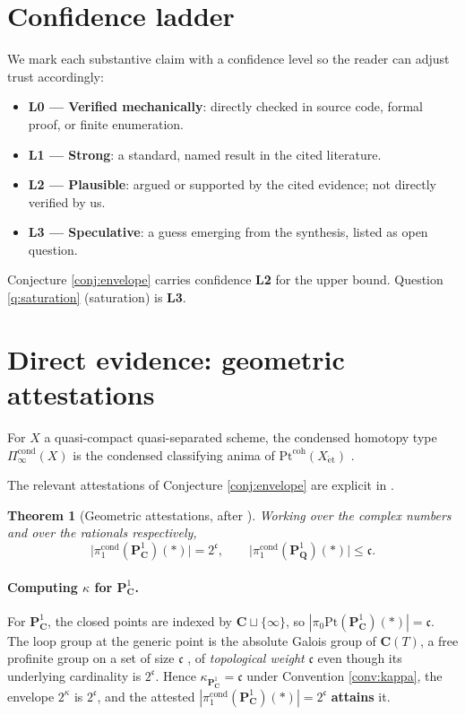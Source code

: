 \documentclass[11pt]{article}
\theoremstyle{definition}
\theoremstyle{plain}
\newtheorem{theorem}{Theorem}
\theoremstyle{remark}
\newcommand{\Pt}{\mathrm{Pt}}
\newcommand{\Pone}{\mathbf{P}^{1}}
\newcommand{\C}{\mathbf{C}}
\newcommand{\Q}{\mathbf{Q}}
\newcommand{\continuum}{\mathfrak{c}}
\begin{document}
\section{Confidence ladder}\label{sec:confidence}

We mark each substantive claim with a confidence level so the reader can
adjust trust accordingly:

\begin{itemize}
\item \textbf{L0 --- Verified mechanically}: directly checked in source code,
  formal proof, or finite enumeration.
\item \textbf{L1 --- Strong}: a standard, named result in the cited literature.
\item \textbf{L2 --- Plausible}: argued or supported by the cited evidence; not
  directly verified by us.
\item \textbf{L3 --- Speculative}: a guess emerging from the synthesis, listed
  as open question.
\end{itemize}

Conjecture \ref{conj:envelope} carries confidence \textbf{L2} for the upper
bound. Question \ref{q:saturation} (saturation) is \textbf{L3}.

\section{Direct evidence: geometric attestations}\label{sec:direct}

For $X$ a quasi-compact quasi-separated scheme, the condensed homotopy type
$\Pi_\infty^{\mathrm{cond}}(X)$ is the condensed classifying anima of
$\Pt^{\mathrm{coh}}(X_{\mathrm{\acute{e}t}})$ \cite[\S 3]{HHLMMW2025}.

The relevant attestations of Conjecture \ref{conj:envelope} are explicit in
\cite[Remark 7.14, Example 7.9]{HHLMMW2025}.

\begin{theorem}[Geometric attestations, after \cite{HHLMMW2025}]\label{thm:geomatt}
Working over the complex numbers and over the rationals respectively,
\begin{equation}
\bigl| \pi_1^{\mathrm{cond}}(\Pone_{\C})(\ast) \bigr| = 2^{\continuum},
\qquad
\bigl| \pi_1^{\mathrm{cond}}(\Pone_{\Q})(\ast) \bigr| \le \continuum.
\end{equation}
\end{theorem}

\paragraph{Computing $\kappa$ for $\Pone_{\C}$.}
For $\Pone_{\C}$, the closed points are indexed by $\C \sqcup \{\infty\}$, so
$|\pi_0\Pt(\Pone_{\C})(\ast)| = \continuum$. The loop group at the generic
point is the absolute Galois group of $\C(T)$, a free profinite group on a
set of size $\continuum$ \cite[Theorem 2]{Douady1964}, of \emph{topological
weight} $\continuum$ even though its underlying cardinality is
$2^{\continuum}$. Hence $\kappa_{\Pone_{\C}} = \continuum$ under
Convention \ref{conv:kappa}, the envelope $2^{\kappa}$ is $2^{\continuum}$,
and the attested $|\pi_1^{\mathrm{cond}}(\Pone_{\C})(\ast)| = 2^{\continuum}$
\textbf{attains} it.
\end{document}
